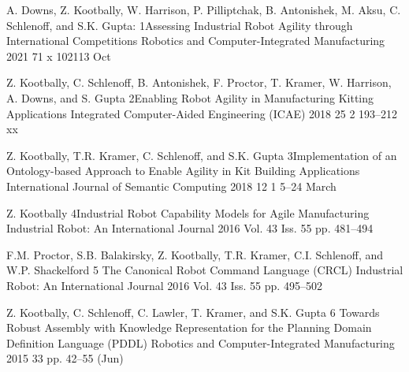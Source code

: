 



\cvarticle
{A. Downs, Z. Kootbally, W. Harrison, P. Pilliptchak, B. Antonishek, M. Aksu, C. Schlenoff, and S.K. Gupta:} %
{1}{Assessing Industrial Robot Agility through International Competitions} %
{Robotics and Computer-Integrated Manufacturing} %
{2021} %
{71} %
{x} %
{102113} %
{Oct} %


\cvarticle
{Z. Kootbally, C. Schlenoff, B. Antonishek, F. Proctor, T. Kramer, W. Harrison, A. Downs, and S. Gupta} %
{2}{Enabling Robot Agility in Manufacturing Kitting Applications} %
{Integrated Computer-Aided Engineering (ICAE)} %
{2018} %
{25} %
{2} %
{193--212} %
{xx} %

\cvarticle
{Z. Kootbally, T.R. Kramer, C. Schlenoff, and S.K. Gupta} %
{3}{Implementation of an Ontology-based Approach to Enable Agility in Kit Building Applications} %
{International Journal of Semantic Computing} %
{2018} %
{12} %
{1} %
{5--24} %
{March} %

\cvarticle
{Z. Kootbally} %
{4}{Industrial Robot Capability Models for Agile Manufacturing} %
{Industrial Robot: An International Journal} %
{2016} %
{Vol. 43} %
{Iss. 55} %
{pp. 481--494} %
{} %

\cvarticle
{F.M. Proctor, S.B. Balakirsky, Z. Kootbally, T.R. Kramer, C.I. Schlenoff, and W.P. Shackelford} %
{5}
{The Canonical Robot Command Language (CRCL)} %
{Industrial Robot: An International Journal} %
{2016} %
{Vol. 43} %
{Iss. 55} %
{pp. 495--502} %
{} %



\cvarticle
{Z. Kootbally, C. Schlenoff, C. Lawler, T. Kramer, and S.K. Gupta} %
{6}
{Towards Robust Assembly with Knowledge Representation for the Planning Domain Definition Language (PDDL)} %
{Robotics and Computer-Integrated Manufacturing} %
{2015} %
{33} %
{} %
{pp. 42--55} %
{(Jun)} %

